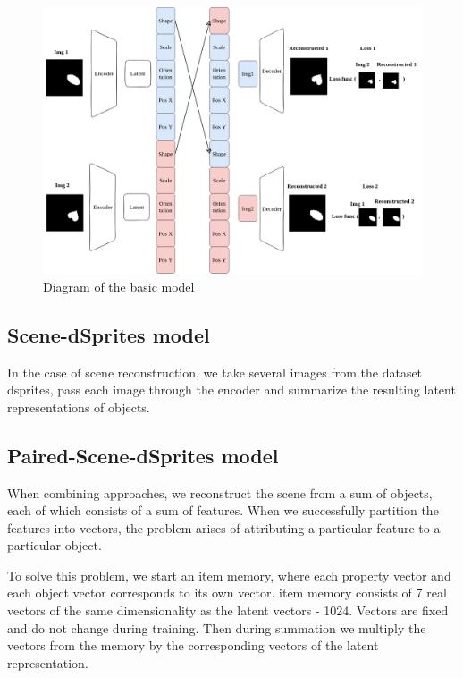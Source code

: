 \documentclass{article}
\begin{document}
    \begin{figure}[ht]
        \centering
        \includegraphics[width=\linewidth]{img/model/paired_dsprites_model}
        \caption{Diagram of the basic model}
        \label{fig:paired_dsprites_model}

    \end{figure}

    \subsection{Scene-dSprites model}

    In the case of scene reconstruction, we take several images from the dataset
    dsprites, pass each image through the encoder and summarize the resulting
    latent representations of objects.

    \subsection{Paired-Scene-dSprites model}
    When combining approaches, we reconstruct the scene from a sum of objects,
    each of which consists of a sum of features. When we successfully partition
    the features into vectors, the problem arises of attributing a particular
    feature to a particular object.

    To solve this problem, we start an item memory, where each property vector
    and each object vector corresponds to its own vector.
    item memory consists of 7 real vectors of the same dimensionality as the
    latent vectors - 1024.
    Vectors are fixed and do not change during training.
    Then during summation we multiply the vectors from the memory by the corresponding
    vectors of the latent representation.
\end{document}
